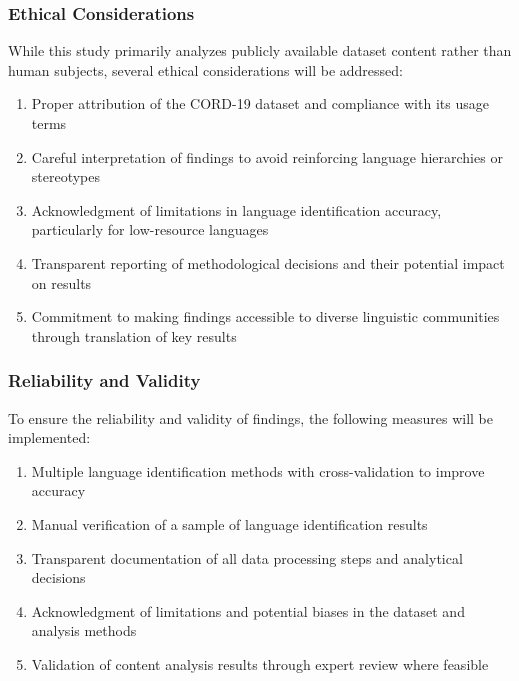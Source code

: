\documentclass[
]{article}
\providecommand{\tightlist}{%
  \setlength{\itemsep}{0pt}\setlength{\parskip}{0pt}}\usepackage{longtable,booktabs,array}
\begin{document}
\subsubsection{Ethical Considerations}\label{ethical-considerations}

While this study primarily analyzes publicly available dataset content
rather than human subjects, several ethical considerations will be
addressed:

\begin{enumerate}
\def\labelenumi{\arabic{enumi}.}
\tightlist
\item
  Proper attribution of the CORD-19 dataset and compliance with its
  usage terms
\item
  Careful interpretation of findings to avoid reinforcing language
  hierarchies or stereotypes
\item
  Acknowledgment of limitations in language identification accuracy,
  particularly for low-resource languages
\item
  Transparent reporting of methodological decisions and their potential
  impact on results
\item
  Commitment to making findings accessible to diverse linguistic
  communities through translation of key results
\end{enumerate}

\subsubsection{Reliability and Validity}\label{reliability-and-validity}

To ensure the reliability and validity of findings, the following
measures will be implemented:

\begin{enumerate}
\def\labelenumi{\arabic{enumi}.}
\tightlist
\item
  Multiple language identification methods with cross-validation to
  improve accuracy
\item
  Manual verification of a sample of language identification results
\item
  Transparent documentation of all data processing steps and analytical
  decisions
\item
  Acknowledgment of limitations and potential biases in the dataset and
  analysis methods
\item
  Validation of content analysis results through expert review where
  feasible
\end{enumerate}
\end{document}
